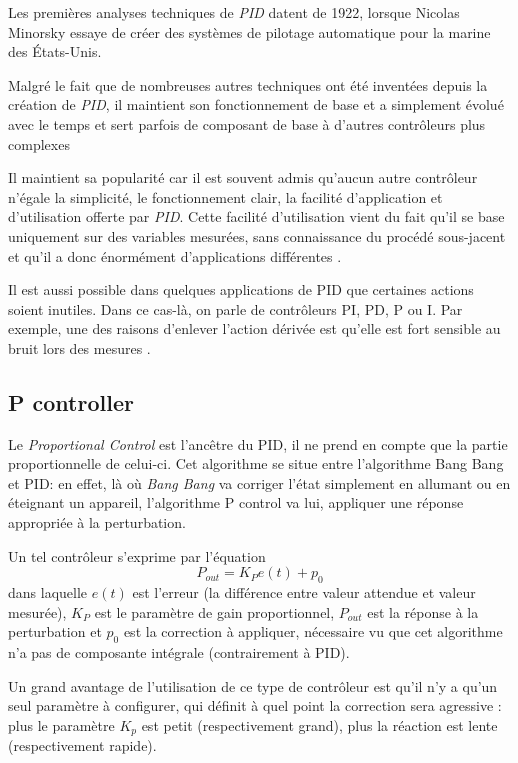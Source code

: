 \documentclass[a4paper,10pt]{report}
\begin{document}
Les premières analyses techniques de \emph{PID} datent de 1922, lorsque Nicolas Minorsky essaye de créer des systèmes de pilotage automatique pour la marine des États-Unis. \cite{minorsky1922directional}

Malgré le fait que de nombreuses autres techniques ont été inventées depuis la création de \emph{PID}, il maintient son fonctionnement de base et a simplement évolué avec le temps et sert parfois de composant de base à d'autres contrôleurs plus complexes \cite{ang2005pid} \cite{visioli2006practical}

Il maintient sa popularité car il est souvent admis qu'aucun autre contrôleur n'égale la simplicité, le fonctionnement clair, la facilité d'application et d'utilisation offerte par \emph{PID}. Cette facilité d'utilisation vient du fait qu'il se base uniquement sur des variables mesurées, sans connaissance du procédé sous-jacent et qu'il a donc énormément d'applications différentes \cite{bennett1993history}.

Il est aussi possible dans quelques applications de PID que certaines actions soient inutiles.
Dans ce cas-là, on parle de contrôleurs PI, PD, P ou I.
Par exemple, une des raisons d'enlever l'action dérivée est qu'elle est fort sensible au bruit lors des mesures \cite{svrcek2014real}.

\subsection{P controller}
Le \emph{Proportional Control} est l'ancêtre du PID, il ne prend en compte que la partie proportionnelle de celui-ci.
Cet algorithme se situe entre l'algorithme Bang Bang et PID:
en effet, là où \emph{Bang Bang} va corriger l'état simplement en allumant ou en éteignant un appareil, l'algorithme P control va lui, appliquer une réponse appropriée à la perturbation.

Un tel contrôleur s'exprime par l'équation
\begin{equation}P_{out} = K_{P}e(t) + p_0\end{equation}
dans laquelle $e(t)$ est l'erreur (la différence entre valeur attendue et valeur mesurée), $K_{P}$ est le paramètre de gain proportionnel, $P_{out}$ est la réponse à la perturbation et $p_0$ est la correction à appliquer, nécessaire vu que cet algorithme n'a pas de composante intégrale (contrairement à PID).

Un grand avantage de l'utilisation de ce type de contrôleur est qu'il n'y a qu'un seul paramètre à configurer, qui définit à quel point la correction sera agressive : plus le paramètre $K_{p}$ est petit (respectivement grand), plus la réaction est lente (respectivement rapide).
\end{document}
